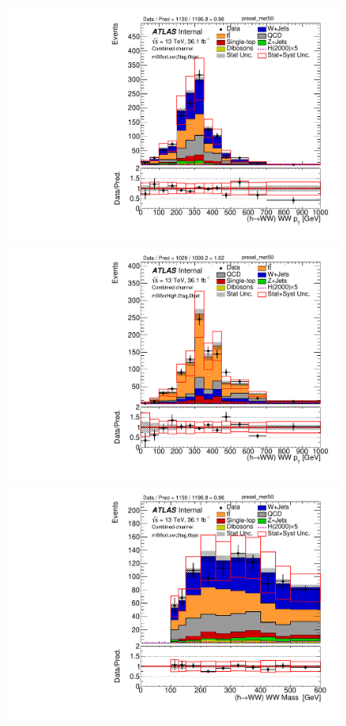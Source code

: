 \begin{figure}[!h]
\begin{center}
\includegraphics[scale=0.33]{./figures/boosted/PlotByMbbRegions/DataMC_2tag_0bjet_mbbcrLow_lepton_presel_met50_WWPt}                                                                                
\includegraphics[scale=0.33]{./figures/boosted/PlotByMbbRegions/DataMC_2tag_0bjet_mbbcrHigh_lepton_presel_met50_WWPt}                                                                               
\includegraphics[scale=0.33]{./figures/boosted/PlotByMbbRegions/DataMC_2tag_0bjet_mbbcrLow_lepton_presel_met50_WWMass}                                                                              

\end{center}
\end{figure}
